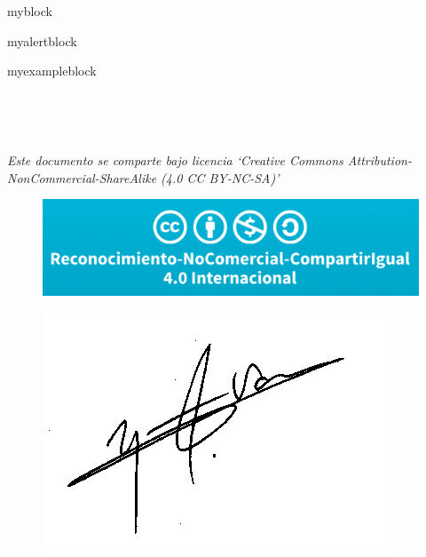 \begin{definition}
	
\end{definition}

\begin{miejemplo}
	
\end{miejemplo}


\begin{miejercicio}
	
\end{miejercicio}

\begin{mipropuesto}
	
\end{mipropuesto}

\begin{myblock}{myblock}
	
\end{myblock}

\begin{myalertblock}{myalertblock}
	
\end{myalertblock}

\begin{myexampleblock}{myexampleblock}
	
\end{myexampleblock}




$\qquad$


$\qquad$



\emph{\normalsize{Este} documento se comparte bajo licencia `Creative Commons Attribution-NonCommercial-ShareAlike (4.0 CC BY-NC-SA)'}


\begin{multicols}{2}
\begin{figure}[H]
	\centering
	\includegraphics[width=.5
	\textwidth]{imagenes/licencia.png}
\end{figure}
\begin{figure}[H]
	\centering
	\includegraphics[width=.25
	\textwidth]{imagenes/firma.png}
\end{figure}
\end{multicols}

